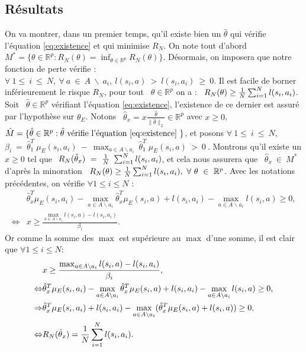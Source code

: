 \documentclass[publibook-draft]{CAp2012}
\begin{document}
\subsection{Résultats}
On va montrer, dans un premier temps, qu'il existe bien un $\hat{\theta}$ qui vérifie l'équation \eqref{eq:existence} et qui minimise $R_N$.
On note tout d'abord ~$M^*=\{\theta\in\mathbb{R}^p:R_N(\theta)=\inf_{\theta \in \mathbb{R}^p}R_N(\theta)\}$. Désormais, on imposera que notre fonction de perte vérifie : ~$\forall~1\leq~i~\leq~N,~\forall~a~\in~A~\backslash~a_i,~l(s_i,a)~>~l(s_i,a_i)~\geq~0$. Il est facile de borner inférieurement le risque $R_N$, pour tout ~$\theta\in\mathbb{R}^p$ on a : ~$R_N(\theta)\geq {1\over N} \sum_{i=1}^N l(s_i,a_i)$. Soit ~$\hat{\theta}\in\mathbb{R}^p$ vérifiant l'équation \eqref{eq:existence}, l'existence de ce dernier est assuré par l'hypothèse sur $\theta_E$. Notons ~$\hat{\theta}_x=x\frac{\hat{\theta}}{\|\hat{\theta}\|_2}\in\mathbb{R}^p$ avec $x\geq0$,~$\hat{M}=\{\hat{\theta}\in\mathbb{R}^p:\hat{\theta} \text{ vérifie l'équation \eqref{eq:existence} }\}$, et posons $\forall~1\leq~i~\leq~N,$\\$\beta_i~=~\hat{\theta}_1^T~\mu_E(s_i,a_i)~-~\max_{a\in A \backslash a_i}~\hat{\theta}_1^T~\mu_E(s_i,a)~>~0~$.
Montrons qu'il existe un $x\geq0$ tel que $~R_N(\hat{\theta}_x)~=~{1\over N}~\sum_{i=1}^N l(s_i,a_i)$, et cela nous assurera que ~$\hat{\theta}_x~\in~M^*$ d'après la minoration ~$R_N(\theta)\geq {1\over N} \sum_{i=1}^N l(s_i,a_i),~\forall~\theta~\in~\mathbb{R}^p$. Avec les notations précédentes, on vérifie $\forall 1\leq i \leq N$ :
\begin{align}
&\hat{\theta}_x^T\mu_E(s_i,a_i)-\max_{a\in A \backslash a_i}\hat{\theta}_x^T\mu_E(s_i,a) + l(s_i,a_i)-\max_{a\in A \backslash a_i}l(s_i,a)\geq0,\\
\Leftrightarrow&x\geq\frac{\max_{a\in A \backslash a_i}l(s_i,a)-l(s_i,a_i)}{\beta_i}.
\end{align}
Or comme la somme des $\max$ est supérieure au $\max$ d'une somme, il est clair que $\forall 1\leq i \leq N$:
\begin{align}
&x\geq\frac{\max_{a\in A \backslash a_i}l(s_i,a)-l(s_i,a_i)}{\beta_i},\\
\Leftrightarrow&\hat{\theta}_x^T\mu_E(s_i,a_i)-\max_{a \in A \backslash a_i}\hat{\theta}_x^T\mu_E(s_i,a) + l(s_i,a_i)-\max_{a\in A \backslash a_i}l(s_i,a)\geq0,\\
\Rightarrow&\hat{\theta}_x^T\mu_E(s_i,a_i) + l(s_i,a_i)-\max_{a \in A  \backslash a_i}(\hat{\theta}_x^T\mu_E(s_i,a)+l(s_i,a))\geq0,\\
\Leftrightarrow&R_N(\hat{\theta}_x)={1\over N} \sum_{i=1}^N l(s_i,a_i).
\end{align}
\end{document}
